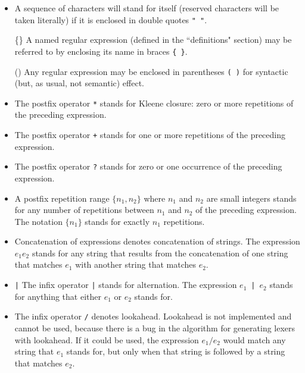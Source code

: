 \begin{itemize}
\item[\verb|"|]        A sequence of characters will stand for itself (reserved
        characters will be taken literally) if it is enclosed in
        double quotes \verb|" "|.

\item[\{\}]        A named regular expression (defined in the ``definitions"
        section) may be referred to by enclosing its name in
        braces \verb|{ }|.

\item[()] Any regular expression may be enclosed in parentheses \verb|( )|
        for syntactic (but, as usual, not semantic) effect.

\item[\verb|*|]        The postfix operator \verb|*| stands for Kleene closure:
        zero or more repetitions of the preceding expression.

\item[\verb|+|]        The postfix operator \verb|+| stands for one or more repetitions
        of the preceding expression.

\item[\verb|?|]        The postfix operator \verb|?| stands for zero or one occurrence of
        the preceding expression.

\item        A postfix repetition range $\{n_1,n_2\}$ where $n_1$ and $n_2$ are small
        integers stands for any number of repetitions between $n_1$ and $n_2$
        of the preceding expression.  The notation $\{n_1\}$ stands for
        exactly $n_1$ repetitions.

\item        Concatenation of expressions denotes concatenation of strings.
        The expression $e_1 e_2$ stands for any string that results from
        the concatenation of one string that matches $e_1$ with another
        string that matches $e_2$.

\item\verb-|-        The infix operator \verb-|- stands for alternation.  The expression
        $e_1$~\verb"|"~$e_2$  stands for anything that either $e_1$ or $e_2$ stands for.
    
\item[\verb|/|]        The infix operator \verb|/| denotes lookahead.  Lookahead is not
        implemented and cannot be used, because there is a bug
        in the algorithm for generating lexers with lookahead.  If
        it could be used, the expression $e_1 / e_2$ would match any string
        that $e_1$ stands for, but only when that string is followed by a
        string that matches $e_2$.


\end{itemize}
